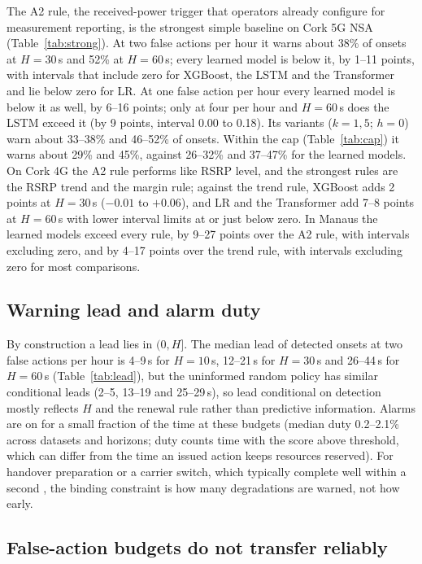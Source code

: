 \documentclass[preprint,review,12pt]{elsarticle}
\begin{document}
The A2 rule, the received-power trigger that operators already configure for
measurement reporting, is the strongest simple baseline on Cork 5G NSA
(Table~\ref{tab:strong}). At two false actions per hour it warns about 38\% of onsets
at $H=30$\,s and 52\% at $H=60$\,s; every learned model is below it, by 1--11 points,
with intervals that include zero for XGBoost, the LSTM and the Transformer and lie below
zero for LR. At one false action per hour every learned model is below it as well, by
6--16 points; only at four per hour and
$H=60$\,s does the LSTM exceed it (by 9 points, interval 0.00 to 0.18). Its variants
($k=1,5$; $h=0$) warn about 33--38\% and 46--52\% of onsets. Within the cap
(Table~\ref{tab:cap}) it warns about 29\% and 45\%, against 26--32\% and 37--47\% for the
learned models. On Cork 4G the A2 rule performs like RSRP level, and the strongest
rules are the RSRP trend and the margin rule; against the trend rule, XGBoost adds 2 points at $H=30$\,s ($-0.01$ to $+0.06$),
and LR and the Transformer add 7--8 points at $H=60$\,s with lower interval limits at or
just below zero. In Manaus the learned models exceed every rule, by 9--27 points over
the A2 rule, with intervals excluding zero, and by 4--17 points over the trend rule,
with intervals excluding zero for most comparisons.

\subsection{Warning lead and alarm duty}
By construction a lead lies in $(0,H]$. The median lead of detected onsets at two
false actions per hour is 4--9\,s for $H=10$\,s, 12--21\,s for $H=30$\,s and
26--44\,s for $H=60$\,s (Table~\ref{tab:lead}), but the uninformed random policy has
similar conditional leads (2--5, 13--19 and 25--29\,s), so lead conditional on
detection mostly reflects $H$ and the renewal rule rather than predictive
information. Alarms are on for a small fraction of the time at these budgets (median
duty 0.2--2.1\% across datasets and horizons; duty counts time with the score above threshold, which can differ
from the time an issued action keeps resources reserved). For handover preparation or
a carrier switch, which typically complete well within a second \cite{tayyab2019}, the
binding constraint is how many degradations are warned, not how early.

\subsection{False-action budgets do not transfer reliably}
\label{sec:transfer}
\end{document}

